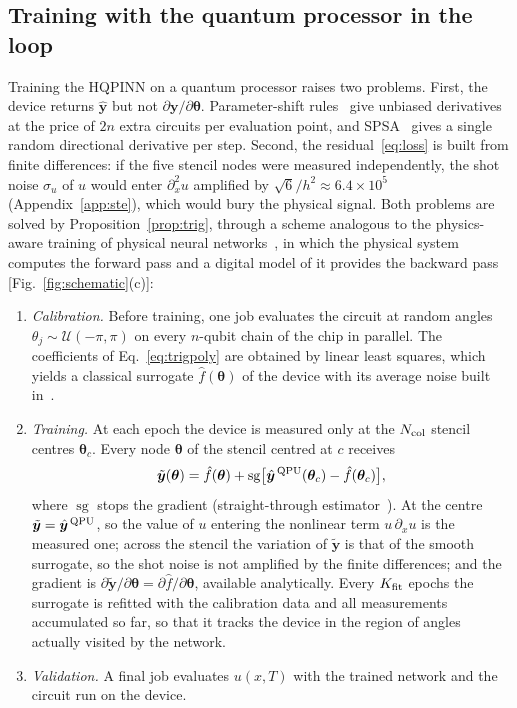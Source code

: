 \documentclass[floatfix,aps,pra,twocolumn,superscriptaddress,10pt,nofootinbib]{revtex4-2}
\newcommand{\sg}{\operatorname{sg}}
\newcommand{\Ncol}{N_{\rm col}}
\begin{document}
\subsection{Training with the quantum processor in the loop}\label{sec:hil}
Training the HQPINN on a quantum processor raises two problems. First, the device returns $\hat{\bm y}$ but not $\partial\bm y/\partial\bm\theta$. Parameter-shift rules~\cite{mitarai2018quantum,schuld2019evaluating,wierichs2022general} give unbiased derivatives at the price of $2n$ extra circuits per evaluation point, and SPSA~\cite{spall1992multivariate,kandala2017hardware} gives a single random directional derivative per step. Second, the residual~\eqref{eq:loss} is built from finite differences: if the five stencil nodes were measured independently, the shot noise $\sigma_u$ of $u$ would enter $\partial_x^2u$ amplified by $\sqrt6/h^2\approx6.4\times10^5$ (Appendix~\ref{app:ste}), which would bury the physical signal. Both problems are solved by Proposition~\ref{prop:trig}, through a scheme analogous to the physics-aware training of physical neural networks~\cite{wright2022deep}, in which the physical system computes the forward pass and a digital model of it provides the backward pass [Fig.~\ref{fig:schematic}(c)]:
\begin{enumerate}
  \item \emph{Calibration.} Before training, one job evaluates the circuit at random angles $\theta_j\sim\mathcal U(-\pi,\pi)$ on every $n$-qubit chain of the chip in parallel. The coefficients of Eq.~\eqref{eq:trigpoly} are obtained by linear least squares, which yields a classical surrogate $\hat f(\bm\theta)$ of the device with its average noise built in~\cite{sung2020using}.
  \item \emph{Training.} At each epoch the device is measured only at the $\Ncol$ stencil centres $\bm\theta_c$. Every node $\bm\theta$ of the stencil centred at $c$ receives
  \begin{equation}
    \tilde{\bm y}(\bm\theta)=\hat f(\bm\theta)+\sg\!\big[\hat{\bm y}^{\,\rm QPU}(\bm\theta_c)-\hat f(\bm\theta_c)\big],
    \label{eq:ste}
  \end{equation}
  where $\sg$ stops the gradient (straight-through estimator~\cite{bengio2013estimating}). At the centre $\tilde{\bm y}=\hat{\bm y}^{\,\rm QPU}$, so the value of $u$ entering the nonlinear term $u\,\partial_xu$ is the measured one; across the stencil the variation of $\tilde{\bm y}$ is that of the smooth surrogate, so the shot noise is not amplified by the finite differences; and the gradient is $\partial\tilde{\bm y}/\partial\bm\theta=\partial\hat f/\partial\bm\theta$, available analytically. Every $K_{\rm fit}$ epochs the surrogate is refitted with the calibration data and all measurements accumulated so far, so that it tracks the device in the region of angles actually visited by the network.
  \item \emph{Validation.} A final job evaluates $u(x,T)$ with the trained network and the circuit run on the device.
\end{enumerate}
\end{document}
